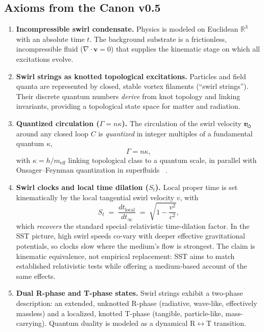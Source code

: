 \documentclass[10pt,reprint,aps,onecolumn,nofootinbib]{revtex4-2}
\newcommand{\vect}[1]{\boldsymbol{#1}} %
\newcommand{\vv}{\vect{v}}
\begin{document}
    \subsection*{Axioms from the Canon v0.5}
        \begin{enumerate}
        \item \textbf{Incompressible swirl condensate.} Physics is modeled on Euclidean $\mathbb{R}^3$ with an absolute time $t$. The background substrate is a frictionless, incompressible fluid ($\nabla \cdot \vv=0$) that supplies the kinematic stage on which all excitations evolve.

        \item \textbf{Swirl strings as knotted topological excitations.} Particles and field quanta are represented by closed, stable vortex filaments (``swirl strings''). Their discrete quantum numbers \emph{derive} from knot topology and linking invariants, providing a topological state space for matter and radiation.

        \item \textbf{Quantized circulation ($\Gamma=n\kappa$).} The circulation of the swirl velocity $\vect{v}_{\mkern-2mu\scriptscriptstyle\boldsymbol{\circlearrowleft}}$ around any closed loop $C$ is \emph{quantized} in integer multiples of a fundamental quantum $\kappa$,
        \[
            \Gamma = n\kappa,
        \]
        with $\kappa=h/m_{\mathrm{eff}}$ linking topological class to a quantum scale, in parallel with Onsager–Feynman quantization in superfluids~ \cite{Onsager1949}.

        \item \textbf{Swirl clocks and local time dilation ($S_t$).} Local proper time is set kinematically by the local tangential swirl velocity $v$, with
        \begin{equation}
        S_t \;=\; \frac{dt_\text{local}}{dt_\infty} \;=\; \sqrt{1-\frac{v^2}{c^2}},
        \label{eq:swirlclock}
        \end{equation}
        which \emph{recovers} the standard special–relativistic time-dilation factor. In the SST picture, high swirl speeds co-vary with deeper effective gravitational potentials, so clocks slow where the medium’s flow is strongest. The claim is kinematic equivalence, not empirical replacement: SST aims to match established relativistic tests while offering a medium-based account of the same effects.

        \item \textbf{Dual R-phase and T-phase states.} Swirl strings exhibit a two-phase description: an extended, unknotted R-phase (radiative, wave-like, effectively massless) and a localized, knotted T-phase (tangible, particle-like, mass-carrying). Quantum duality is modeled as a dynamical R$\leftrightarrow$T transition.


\end{enumerate}
\end{document}
